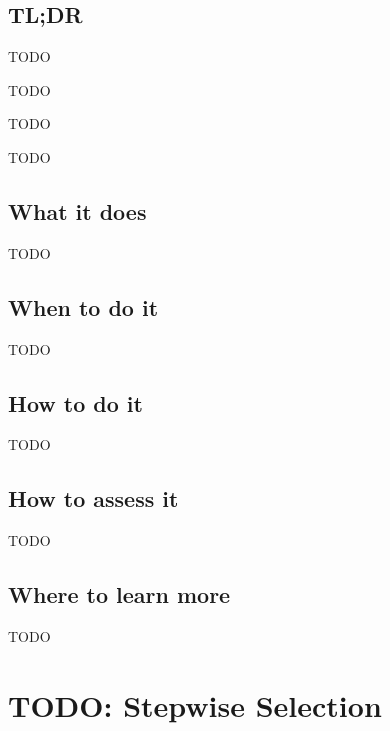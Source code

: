 \documentclass[
]{book}
\providecommand{\tightlist}{%
  \setlength{\itemsep}{0pt}\setlength{\parskip}{0pt}}
\begin{document}
\hypertarget{tldr-10}{%
\section{TL;DR}\label{tldr-10}}

\begin{description}
\tightlist
\item[What it does]
TODO
\item[When to do it]
TODO
\item[How to do it]
TODO
\item[How to assess it]
TODO
\end{description}

\hypertarget{what-it-does-10}{%
\section{What it does}\label{what-it-does-10}}

TODO

\hypertarget{when-to-do-it-10}{%
\section{When to do it}\label{when-to-do-it-10}}

TODO

\hypertarget{how-to-do-it-10}{%
\section{How to do it}\label{how-to-do-it-10}}

TODO

\hypertarget{how-to-assess-it-10}{%
\section{How to assess it}\label{how-to-assess-it-10}}

TODO

\hypertarget{where-to-learn-more-10}{%
\section{Where to learn more}\label{where-to-learn-more-10}}

TODO

\hypertarget{stepwise-selection}{%
\chapter{TODO: Stepwise Selection}\label{stepwise-selection}}
\end{document}
